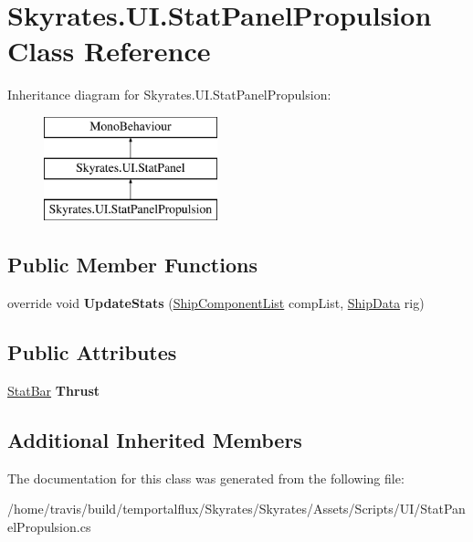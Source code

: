 \hypertarget{class_skyrates_1_1_u_i_1_1_stat_panel_propulsion}{\section{Skyrates.\-U\-I.\-Stat\-Panel\-Propulsion Class Reference}
\label{class_skyrates_1_1_u_i_1_1_stat_panel_propulsion}
}
Inheritance diagram for Skyrates.\-U\-I.\-Stat\-Panel\-Propulsion\-:\begin{figure}[H]
\begin{center}
\leavevmode
\includegraphics[height=3.000000cm]{class_skyrates_1_1_u_i_1_1_stat_panel_propulsion}
\end{center}
\end{figure}
\subsection*{Public Member Functions}
\begin{DoxyCompactItemize}
\item 
\hypertarget{class_skyrates_1_1_u_i_1_1_stat_panel_propulsion_ae0fd0e2e847d14ffe5f62f1c63427aef}{override void {\bfseries Update\-Stats} (\hyperlink{class_skyrates_1_1_ship_1_1_ship_component_list}{Ship\-Component\-List} comp\-List, \hyperlink{class_skyrates_1_1_ship_1_1_ship_data}{Ship\-Data} rig)}\label{class_skyrates_1_1_u_i_1_1_stat_panel_propulsion_ae0fd0e2e847d14ffe5f62f1c63427aef}

\end{DoxyCompactItemize}
\subsection*{Public Attributes}
\begin{DoxyCompactItemize}
\item 
\hypertarget{class_skyrates_1_1_u_i_1_1_stat_panel_propulsion_aac83b20d8bee30c5163348f07d6c43c0}{\hyperlink{class_skyrates_1_1_u_i_1_1_stat_bar}{Stat\-Bar} {\bfseries Thrust}}\label{class_skyrates_1_1_u_i_1_1_stat_panel_propulsion_aac83b20d8bee30c5163348f07d6c43c0}

\end{DoxyCompactItemize}
\subsection*{Additional Inherited Members}


The documentation for this class was generated from the following file\-:\begin{DoxyCompactItemize}
\item 
/home/travis/build/temportalflux/\-Skyrates/\-Skyrates/\-Assets/\-Scripts/\-U\-I/Stat\-Panel\-Propulsion.\-cs\end{DoxyCompactItemize}
